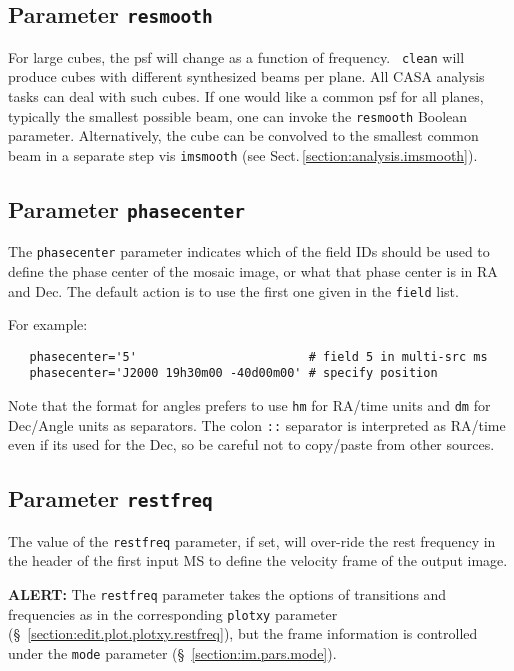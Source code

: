 \subsection{Parameter {\tt resmooth} }
\label{section:im.pars.resmooth}
For large cubes, the psf will change as a function of frequency. {\tt
  clean} will produce cubes with different synthesized beams per
plane.  All CASA analysis tasks can deal with such cubes. If one would
like a common psf for all planes, typically the smallest possible
beam, one can invoke the {\tt resmooth} Boolean
parameter. Alternatively, the cube can be convolved to the smallest
common beam in a separate step vis {\tt imsmooth} (see
Sect.\,\ref{section:analysis.imsmooth}).

\subsection{Parameter {\tt phasecenter} }
\label{section:im.pars.phasecenter}

The {\tt phasecenter} parameter indicates which of the field IDs 
should be used to define the phase center of the mosaic image,
or what that phase center is in RA and Dec.
The default action is to use the first one given in the 
{\tt field} list.

For example:
\small
\begin{verbatim}
   phasecenter='5'                        # field 5 in multi-src ms
   phasecenter='J2000 19h30m00 -40d00m00' # specify position
\end{verbatim}
\normalsize

Note that the format for angles prefers to use {\tt hm} for RA/time
units and {\tt dm} for Dec/Angle units as separators.  The colon
{\tt ::} separator is interpreted as RA/time even if its used for the
Dec, so be careful not to copy/paste from other sources.


\subsection{Parameter {\tt restfreq} }
\label{section:im.pars.restfreq}

The value of the {\tt restfreq} parameter, if set, will over-ride
the rest frequency in the header of the first input MS to define
the velocity frame of the output image.

{\bf ALERT:} The {\tt restfreq} parameter takes the options
of transitions and frequencies as in the corresponding {\tt plotxy}
parameter (\S~\ref{section:edit.plot.plotxy.restfreq}), but the
frame information is controlled under the {\tt mode} parameter
(\S~\ref{section:im.pars.mode}).

